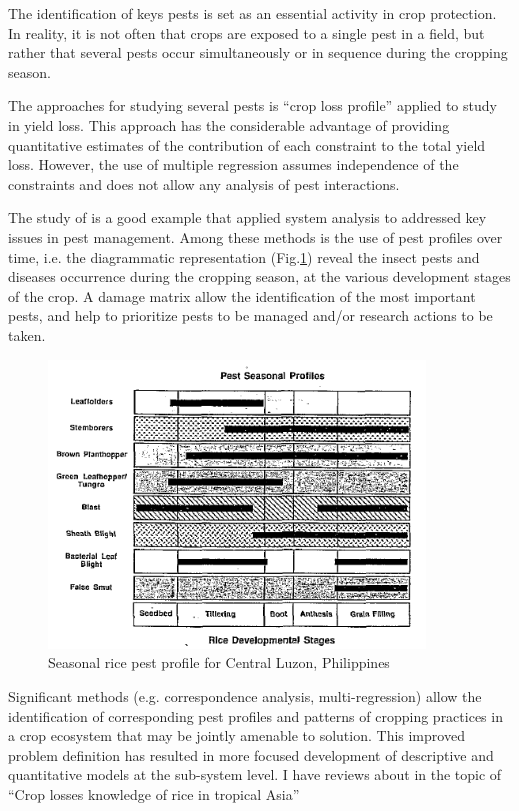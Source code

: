 The identification of keys pests is set as an essential activity in crop protection. In reality, it is not often that crops are exposed to a single pest in a field, but rather that several pests occur simultaneously or in sequence during the cropping season. 

The approaches for studying several pests is ``crop loss profile'' applied to study in yield loss. This approach has the considerable advantage of providing quantitative estimates of the contribution of each constraint to the total yield loss. However, the use of multiple regression assumes independence of the constraints and does not allow any analysis of pest interactions.

The study of \citet{heong1985systems} is a good example that applied system analysis to addressed key issues in pest management. Among these methods is the use of pest profiles over time, i.e. the diagrammatic representation (Fig.\ref{fig:pest_season_profile}) reveal the insect pests and diseases occurrence during the cropping season, at the various development stages of the crop. A damage matrix allow the identification of the most important pests, and help to prioritize pests to be managed and/or research actions to be taken. 

\begin{figure}
\includegraphics[width=10cm]{pest_season_profile}
\centering
\caption{Seasonal rice pest profile for Central Luzon, Philippines \cite{heong1985systems}}
\label{fig:pest_season_profile}
\end{figure}


Significant methods (e.g. correspondence analysis, multi-regression) allow the identification of corresponding pest profiles and patterns of cropping practices in a crop ecosystem that may be jointly amenable to solution. This improved problem definition has resulted in more focused development of descriptive and quantitative models at the sub-system level. I have reviews about in the topic of ``Crop losses knowledge of rice in tropical Asia''

